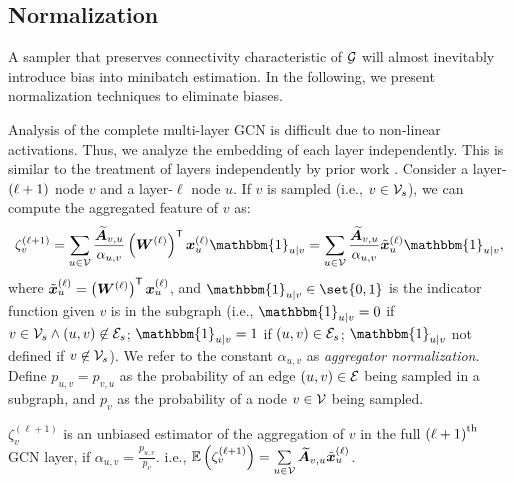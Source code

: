 


\subsection{Normalization}
\label{sec: bias}



A sampler that preserves connectivity characteristic of $\G$ will almost inevitably introduce bias into minibatch estimation. 
In the following, we present normalization techniques to eliminate biases. 

Analysis of the complete multi-layer GCN is difficult due to non-linear activations. Thus, we analyze the embedding of each layer independently. 
This is similar to the treatment of layers independently by prior work \citep{fastgcn,as-gcn}.
Consider a layer-$\left( \ell+1 \right)$ node $v$ and a layer-$\ell$ node $u$. If $v$ is sampled (i.e., $v\in\V[s]$), we can compute the aggregated feature of $v$ as:
\begin{equation}
    \zeta_{v}^{(\ell+1)} = \sum\limits_{u\in\V}\frac{\Anorm_{v,u}}{\alpha_{u,v}}
    \paren{\W[\ell]}^{\trans} \bm{x}_u^{\paren{\ell}}\mathbbm{1}_{u|v} = 
    \sum\limits_{u\in\V}\frac{\Anorm_{v,u}}{\alpha_{u,v}} \Tilde{\bm{x}}_u^{\paren{\ell}} \mathbbm{1}_{u|v},
\end{equation}
where $\Tilde{\bm{x}}_u^{\paren{\ell}} = \paren{\W[\ell]}^{\trans}  \bm{x}_u^{\paren{\ell}}$, and $\mathbbm{1}_{u |v}\in\set{0,1}$ is the indicator function given $v$ is in the subgraph (i.e., $\mathbbm{1}_{u|v}=0$ if $v\in\V[s]\wedge \paren{u,v}\not\in\E[s]$; $\mathbbm{1}_{u|v}=1$ if $\paren{u,v}\in\E[s]$; $\mathbbm{1}_{u|v}$ not defined if $v\not\in\V[s]$). We refer to the constant $\alpha_{u,v}$ as \emph{aggregator normalization}.
Define $p_{u,v}=p_{v,u}$ as the probability of an edge $\paren{u,v}\in\E$ being sampled in a subgraph, and $p_v$ as the probability of a node $v\in\V$ being sampled.
\begin{proposition}
\label{prop: norm}
$\zeta_{v}^{(\ell+1)}$ is an unbiased estimator of the aggregation of $v$ in the full $\left( \ell+1 \right)^{\text{th}}$ GCN layer, if $\alpha_{u,v} = \frac{p_{u,v}}{p_v}$. i.e.,  
$
    \mathbb{E}\paren{\zeta_{v}^{(\ell+1)}} = \sum\limits_{u\in\V}\Anorm_{v,u} \Tilde{\bm{x}}_u^{\paren{\ell}}\nonumber
$.
\end{proposition}

